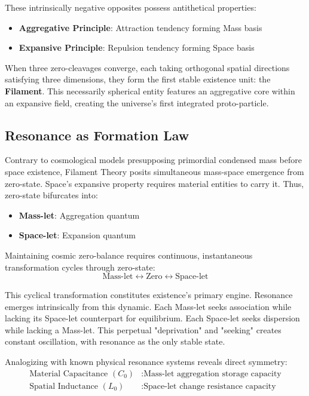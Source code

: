 \documentclass[11pt,a4paper]{article}
\begin{document}
These intrinsically negative opposites possess antithetical properties:
\begin{itemize}
\item \textbf{Aggregative Principle}: Attraction tendency forming Mass basis
\item \textbf{Expansive Principle}: Repulsion tendency forming Space basis
\end{itemize}

When three zero-cleavages converge, each taking orthogonal spatial directions satisfying three dimensions, they form the first stable existence unit: the \textbf{Filament}. This necessarily spherical entity features an aggregative core within an expansive field, creating the universe's first integrated proto-particle.

\subsection{Resonance as Formation Law}

Contrary to cosmological models presupposing primordial condensed mass before space existence, Filament Theory posits simultaneous mass-space emergence from zero-state. Space's expansive property requires material entities to carry it. Thus, zero-state bifurcates into:
\begin{itemize}
\item \textbf{Mass-let}: Aggregation quantum
\item \textbf{Space-let}: Expansion quantum
\end{itemize}

Maintaining cosmic zero-balance requires continuous, instantaneous transformation cycles through zero-state:
\begin{equation}
\text{Mass-let} \leftrightarrow \text{Zero} \leftrightarrow \text{Space-let}
\end{equation}

This cyclical transformation constitutes existence's primary engine. Resonance emerges intrinsically from this dynamic. Each Mass-let seeks association while lacking its Space-let counterpart for equilibrium. Each Space-let seeks dispersion while lacking a Mass-let. This perpetual "deprivation" and "seeking" creates constant oscillation, with resonance as the only stable state.

Analogizing with known physical resonance systems reveals direct symmetry:
\begin{align}
\text{Material Capacitance } (C_0) &: \text{Mass-let aggregation storage capacity}\\
\text{Spatial Inductance } (L_0) &: \text{Space-let change resistance capacity}
\end{align}
\end{document}
